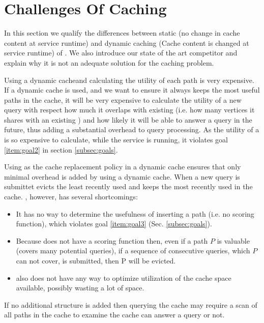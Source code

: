 \section{Challenges Of \spath Caching}\label{sec:competitors}

In this section we qualify the differences between static (no change in cache content at service runtime) and dynamic caching (Cache content is changed at service runtime) of \spathsns. We also introduce our state of the art competitor and explain why it is not an adequate solution for the \spath caching problem.


Using a dynamic cache\footnotemark and calculating the utility of each path is very expensive. If a dynamic cache is used, and we want to ensure it always keeps the most useful paths in the cache, it will be very expensive to calculate the utility of a new query with respect how much it overlaps with existing \spaths (i.e. how many vertices it shares with an existing \spathns) and how likely it will be able to answer a query in the future, thus adding a substantial overhead to query processing. As the utility of a \spath is so expensive to calculate, while the \spath service is running, it violates goal \ref{item:goal2} in section \ref{subsec:goals}.

Using \lru as the cache replacement policy in a dynamic cache ensures that only minimal overhead is added by using a dynamic cache. When a new query is submittet \lru evicts the least recently used \spath and keeps the most recently used \spaths in the cache.
\lru, however, has several shortcomings: 
\begin{itemize}
\item It has no way to determine the usefulness of inserting a path (i.e. no scoring function), which violates goal \ref{item:goal3} (Sec. \ref{subsec:goals}). 
\item Because \lru does not have a scoring function then, even if a path $P$ is valuable (covers many potential queries), if a sequence of consecutive queries, which $P$ can not cover, is submitted, then P will be evicted. 
\item \lru also does not have any way to optimize utilization of the cache space available, possibly wasting a lot of space. 
\end{itemize}

If no additional structure is added then querying the cache may require a scan of all paths in the cache to examine the cache can answer a query or not.






